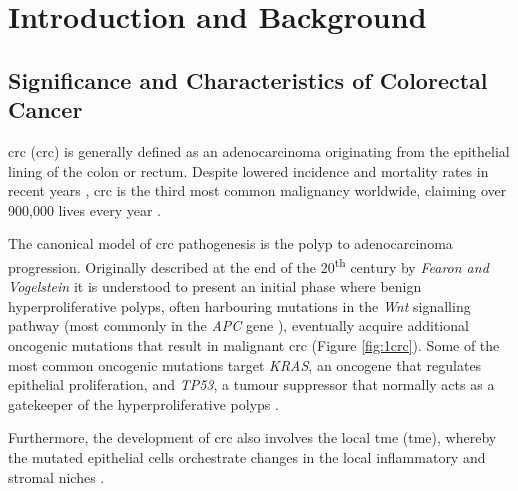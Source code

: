 \chapter{Introduction and Background}
\label{01intro}







\newpage
\section{Significance and Characteristics of Colorectal Cancer}

\acrlong{crc} (\acrshort{crc}) is generally defined as an adenocarcinoma originating from the epithelial lining of the colon or rectum. Despite lowered incidence and mortality rates in recent years \cite{cronin_annual_2022}, \acrshort{crc} is the third most common malignancy worldwide, claiming over 900,000 lives every year \cite{morgan_global_2023}.

The canonical model of \acrshort{crc} pathogenesis is the polyp to adenocarcinoma progression. Originally described at the end of the 20\textsuperscript{th} century by \emph{Fearon and Vogelstein} \cite{fearon_genetic_1990} it is understood to present an initial phase where benign hyperproliferative polyps, often harbouring mutations in the \emph{Wnt} signalling pathway (most commonly in the \emph{APC} gene \cite{aghabozorgi_role_2019}), eventually acquire additional oncogenic mutations that result in malignant \acrshort{crc} (Figure \ref{fig:1crc}). Some of the most common oncogenic mutations target \emph{KRAS}, an oncogene that regulates epithelial proliferation, and \emph{TP53}, a tumour suppressor that normally acts as a gatekeeper of the hyperproliferative polyps \cite{fearon_genetic_1990,armaghany_genetic_2012}. 

Furthermore, the development of \acrshort{crc} also involves the local \acrlong{tme} (\acrshort{tme}), whereby the mutated epithelial cells orchestrate changes in the local inflammatory and stromal niches \cite{peddareddigari_tumor_2010}.

